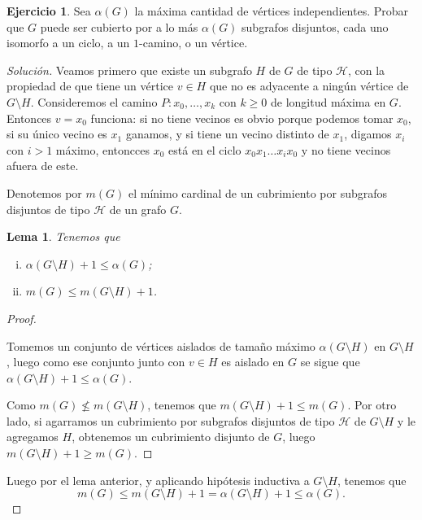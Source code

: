 \documentclass[12pt]{report}
\theoremstyle{plain}
\newtheorem{lemma}[theorem]{Lema}
\theoremstyle{definition}
\newtheorem{exercise}[theorem]{Ejercicio}
\newenvironment{solution}{\begin{proof}[Solución]}{\end{proof}}
\begin{document}
\begin{exercise}
Sea $\alpha (G)$ la máxima cantidad de vértices independientes. Probar que $G$ puede ser cubierto por a lo más $\alpha (G)$ subgrafos disjuntos, cada uno isomorfo a un ciclo, a un $1$-camino, o un vértice.
\end{exercise}
\begin{solution}
Veamos primero que existe un subgrafo $H$ de $G$ de tipo $\mathcal H$, con la propiedad de que tiene un vértice $v\in H$ que no es adyacente a ningún vértice de $G \setminus H$. Consideremos el camino $P : x_0, \ldots, x_k$ con $k\geq 0$ de longitud máxima en $G$. Entonces $v = x_0$ funciona: si no tiene vecinos es obvio porque podemos tomar $x_0$, si su único vecino es $x_1$ ganamos, y si tiene un vecino distinto de $x_1$, digamos $x_i$ con $i > 1$ máximo, entoncces $x_0$ está en el ciclo $x_0 x_1 \ldots x_i x_0$ y no tiene vecinos afuera de este.

Denotemos por $m(G)$ el mínimo cardinal de un cubrimiento por subgrafos disjuntos de tipo $\mathcal H$ de un grafo $G$.

\begin{lemma}
Tenemos que \begin{enumerate}[(i)]
\item $\alpha (G\setminus H) + 1 \leq \alpha (G)$;
\item $m(G) \leq m(G\setminus H) + 1$.
\end{enumerate}
\end{lemma}
\begin{proof}
\begin{enumerate}[(i)]
\end{enumerate}
\item Tomemos un conjunto de vértices aislados de tamaño máximo $\alpha (G \setminus H)$ en $G \setminus H$, luego como ese conjunto junto con $v \in H$ es aislado en $G$ se sigue que $\alpha (G \setminus H) + 1 \leq \alpha (G)$.

\item Como $m(G) \not \leq m(G \setminus H)$, tenemos que $m(G\setminus H) +1 \leq m(G)$. Por otro lado, si agarramos un cubrimiento por subgrafos disjuntos de tipo $\mathcal H$ de $G \setminus H$ y le agregamos $H$, obtenemos un cubrimiento disjunto de $G$, luego $m(G\setminus H) + 1 \geq m(G)$.
\end{proof}

Luego por el lema anterior, y aplicando hipótesis inductiva a $G \setminus H$, tenemos que
\[
    m(G) \leq m(G\setminus H) + 1 = \alpha (G\setminus H) + 1 \leq \alpha (G).
\]
\end{solution}
\end{document}
